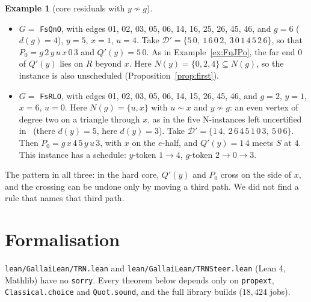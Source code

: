 \documentclass[11pt]{amsart}
\theoremstyle{definition}
\newtheorem{example}[theorem]{Example}
\newcommand{\cD}{\mathcal D}
\begin{document}
\begin{example}[core residuals with $y\not\sim g$]\label{ex:FsQnO}
\begin{itemize}
\item $G=$ \texttt{FsQnO}, with edges 01, 02, 03, 05, 06, 14, 16, 25, 26, 45, 46, and $g=6$ ($d(g)=4$),
$y=5$, $x=1$, $u=4$. Take $\cD'=\{5\,0,\ 1\,6\,0\,2,\ 3\,0\,1\,4\,5\,2\,6\}$, so that
$P_0=g\,2\,y\,u\,x\,0\,3$ and $Q'(y)=5\,0$. As in Example~\ref{ex:FqJPo}, the far end $0$ of $Q'(y)$
lies on $R$ beyond $x$. Here $N(y)=\{0,2,4\}\subseteq N(g)$, so the instance is also unscheduled
(Proposition~\ref{prop:first}).
\item $G=$ \texttt{FsRLO}, with edges 01, 02, 03, 05, 06, 14, 15, 26, 45, 46, and $g=2$, $y=1$, $x=6$, $u=0$.
Here $N(g)=\{u,x\}$ with $u\sim x$ and $y\not\sim g$: an even vertex of degree two on a triangle
through $x$, as in the five N-instances left uncertified in~\cite{CN} (there $d(y)=5$, here
$d(y)=3$). Take $\cD'=\{1\,4,\ 2\,6\,4\,5\,1\,0\,3,\ 5\,0\,6\}$.
Then $P_0=g\,x\,4\,5\,y\,u\,3$, with $x$ on the $e$-half, and $Q'(y)=1\,4$ meets $S$ at $4$. This
instance has a schedule: $y$-token $1\to4$, $g$-token $2\to0\to3$.
\end{itemize}
\end{example}

The pattern in all three: in the hard core, $Q'(y)$ and $P_0$ cross on the side of $x$, and the
crossing can be undone only by moving a third path. We did not find a rule that names that third
path.

\section{Formalisation}\label{sec:lean}

\texttt{lean/GallaiLean/TRN.lean} and \texttt{lean/GallaiLean/TRNSteer.lean} (Lean 4, Mathlib) have
no \texttt{sorry}. Every theorem below depends only on \texttt{propext}, \texttt{Classical.choice}
and \texttt{Quot.sound}, and the full library builds ($18{,}424$ jobs).
\end{document}
